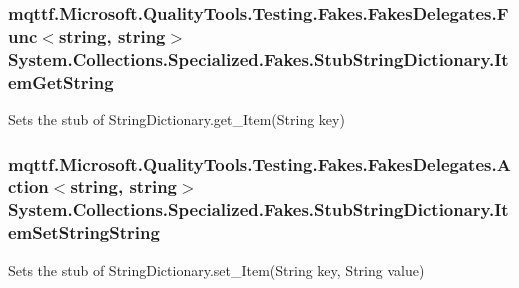 \hypertarget{class_system_1_1_collections_1_1_specialized_1_1_fakes_1_1_stub_string_dictionary_ae7e1c157cd848564586c2df7fe1cad90}{
\subsubsection[{Item\-Get\-String}]{\setlength{\rightskip}{0pt plus 5cm}mqttf.\-Microsoft.\-Quality\-Tools.\-Testing.\-Fakes.\-Fakes\-Delegates.\-Func$<$string, string$>$ System.\-Collections.\-Specialized.\-Fakes.\-Stub\-String\-Dictionary.\-Item\-Get\-String}}\label{class_system_1_1_collections_1_1_specialized_1_1_fakes_1_1_stub_string_dictionary_ae7e1c157cd848564586c2df7fe1cad90}


Sets the stub of String\-Dictionary.\-get\-\_\-\-Item(\-String key)

\hypertarget{class_system_1_1_collections_1_1_specialized_1_1_fakes_1_1_stub_string_dictionary_a8f00e335946cc5d0a0c58fa88250f212}{
\subsubsection[{Item\-Set\-String\-String}]{\setlength{\rightskip}{0pt plus 5cm}mqttf.\-Microsoft.\-Quality\-Tools.\-Testing.\-Fakes.\-Fakes\-Delegates.\-Action$<$string, string$>$ System.\-Collections.\-Specialized.\-Fakes.\-Stub\-String\-Dictionary.\-Item\-Set\-String\-String}}\label{class_system_1_1_collections_1_1_specialized_1_1_fakes_1_1_stub_string_dictionary_a8f00e335946cc5d0a0c58fa88250f212}


Sets the stub of String\-Dictionary.\-set\-\_\-\-Item(\-String key, String value)

